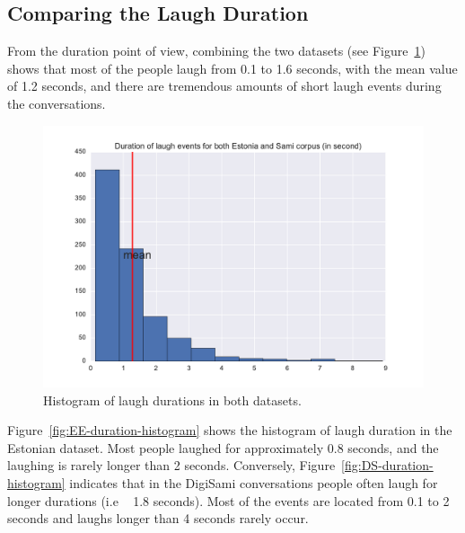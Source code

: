 \documentclass[10pt,journal,compsoc]{IEEEtran}
\begin{document}
\subsection{Comparing the Laugh Duration}
\label{sec:laugh-duration}

From the duration point of view, combining the two datasets (see Figure~\ref{fig:all-duration-histogram}) shows that most of the people laugh from 0.1 to 1.6 seconds, with the mean value of 1.2 seconds, and there are tremendous amounts of short laugh events during the conversations.

\begin{figure}[!t]
\centering
\includegraphics[width=1\linewidth]{figures/all/duration_hist.pdf}
\caption{Histogram of laugh durations in both datasets.}
\label{fig:all-duration-histogram}
\end{figure}

Figure~\ref{fig:EE-duration-histogram} shows the histogram of laugh duration in the Estonian dataset.
Most people laughed for approximately 0.8 seconds, and the laughing is rarely longer than 2 seconds.
Conversely, Figure~\ref{fig:DS-duration-histogram} indicates that in the DigiSami conversations people often laugh for longer durations (i.e ~ 1.8 seconds). Most of the events are located from 0.1 to 2 seconds and laughs longer than 4 seconds rarely occur.
\end{document}
